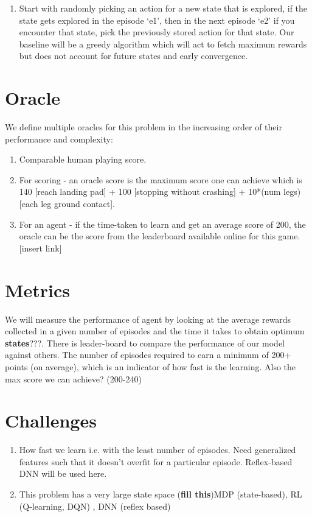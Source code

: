 \documentclass[12pt]{article}
\begin{document}
\begin{enumerate}[label=(\alph*)]
\begin{center}
\end{center}
\item Start with randomly picking an action for a new state that is explored, if the state gets explored in the episode ‘e1’, then in the next episode ‘e2’ if you encounter that state, pick the previously stored action for that state. Our baseline will be a greedy algorithm which will act to  fetch maximum rewards but does not account for future states and early convergence.
\end{enumerate}


\section{Oracle}
We define multiple oracles for this problem in the increasing order of their performance and complexity:
\begin{enumerate}[label=(\alph*)]
\item Comparable human playing score.
\item For scoring - an oracle score is the maximum score one can achieve which is 140 [reach landing pad]  + 100 [stopping without crashing] + 10*(num legs) [each leg ground contact].
\item For an agent - if the time-taken to learn and get an average score of 200, the oracle can be the score from the leaderboard available online for this game. [insert link]
\end{enumerate}

\section{Metrics}
We will measure the performance of agent by looking at the average rewards collected in a given number of episodes and the time it takes to obtain optimum \textbf{states}???. There is leader-board to compare the performance of our model against others. \citep{leaderboard}
\newline
 The number of episodes required to earn a minimum of 200+ points (on average), which is an indicator of how fast is the learning.\newline
Also the max score we can achieve? (200-240)


\section{Challenges}
\begin{enumerate}[label=(\alph*)]
\item How fast we learn i.e. with the least number of episodes. Need generalized features such that it doesn’t overfit for a particular episode. Reflex-based DNN will be used here.
\item This problem has a very large state space (\textbf{fill this})MDP (state-based), RL (Q-learning, DQN) , DNN (reflex based)
\end{enumerate}



\end{document}

